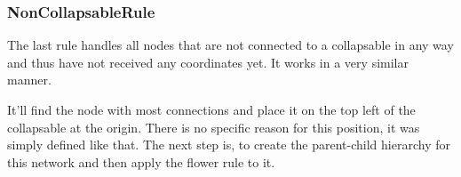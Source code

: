 \subsubsection{NonCollapsableRule}
The last rule handles all nodes that are not connected to a collapsable in any way and thus have not received any coordinates yet. It works in a very similar manner.

It'll find the node with most connections and place it on the top left of the collapsable at the origin. There is no specific reason for this position, it was simply defined like that. The next step is, to create the parent-child hierarchy for this network and then apply the flower rule to it.

